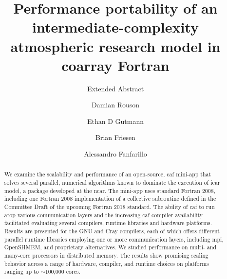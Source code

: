 \documentclass[sigconf]{acmart}
\begin{document}

\title[Performance portability of coarray-ICAR]{Performance portability of an intermediate-complexity atmospheric research model in coarray Fortran}
\subtitle{Extended Abstract}

\author{Damian Rouson}
\renewcommand{\shortauthors}{D. Rouson et al.}

\author{Ethan D Gutmann}

\author{Brian Friesen}

\author{Alessandro Fanfarillo}

\begin{abstract}
We examine the scalability and performance of an open-source, \gls{caf} \gls{mini-app} that solves
several parallel, numerical algorithms known to dominate the execution of \gls{icar}~\cite{gutmann2016intermediate} model,
a package developed at the \gls{ncar}.
The \gls{mini-app} uses standard Fortran 2008, including one Fortran 2008 implementation of a collective
subroutine defined in the Committee Draft of the upcoming Fortran 2018 standard.  The ability of \gls{caf} to run atop various
communication layers and the increasing \gls{caf} compiler availability facilitated evaluating several compilers,
runtime libraries and hardware platforms.  Results are presented for the GNU and Cray compilers, each of which offers
different parallel runtime libraries employing one or more communication layers, including \gls{mpi}, OpenSHMEM, and proprietary
alternatives.  We studied performance on multi- and many-core processors in distributed memory.  The
results show promising scaling behavior across a range of hardware, compiler, and runtime choices
on platforms ranging up to $\sim$100,000 cores.
\end{abstract}
\end{document}
